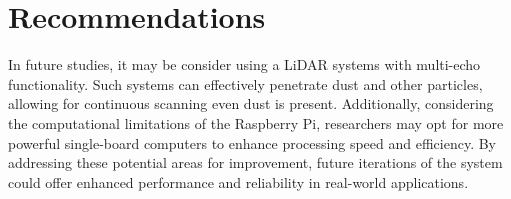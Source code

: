 \section{Recommendations}
In future studies, it may be consider using a LiDAR systems with multi-echo functionality. Such systems can effectively penetrate dust and other particles, allowing for continuous scanning even dust is present. Additionally, considering the computational limitations of the Raspberry Pi, researchers may opt for more powerful single-board computers to enhance processing speed and efficiency. By addressing these potential areas for improvement, future iterations of the system could offer enhanced performance and reliability in real-world applications.